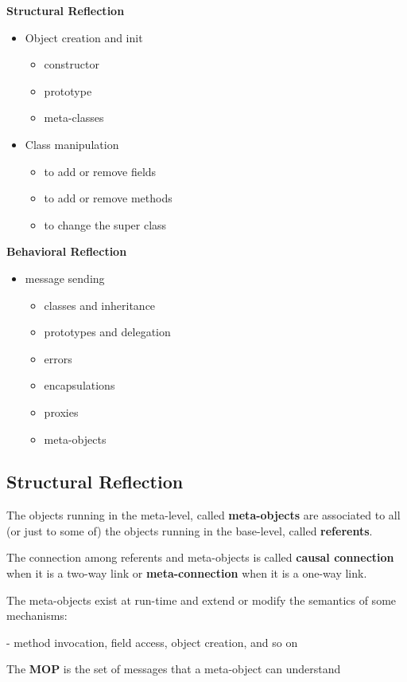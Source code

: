 \textbf{Structural Reflection}
\begin{itemize}
	\item Object creation and init
		\begin{itemize}
			\item constructor
			\item prototype
			\item meta-classes
		\end{itemize}
	\item Class manipulation
		\begin{itemize}
			\item to add or remove fields
			\item to add or remove methods
			\item to change the super class
		\end{itemize}
\end{itemize}

\textbf{Behavioral Reflection}
\begin{itemize}
	\item message sending
		\begin{itemize}
			\item classes and inheritance
			\item prototypes and delegation
			\item errors
			\item encapsulations
			\item proxies
			\item meta-objects
		\end{itemize}
\end{itemize}

\subsection{Structural Reflection}
The objects running in the meta-level, called \textbf{meta-objects} are associated to all (or just to some of) the objects running in the base-level, called \textbf{referents}.

The connection among referents and meta-objects is called \textbf{causal connection} when it is a two-way link or \textbf{meta-connection} when it is a one-way link.

The meta-objects exist at run-time and extend or modify the semantics of some mechanisms:

-  method invocation, field access, object creation, and so on

The \textbf{MOP} is the set of messages that a meta-object can understand


